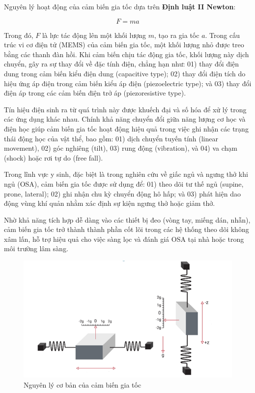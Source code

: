 Nguyên lý hoạt động của cảm biến gia tốc dựa trên 
\textbf{Định luật II Newton}:

\begin{equation}
F = ma
\end{equation}

Trong đó, $F$ là lực tác động lên một khối lượng $m$, tạo ra gia tốc $a$. Trong cấu trúc vi cơ điện tử (MEMS) của cảm biến gia tốc, một khối lượng nhỏ được treo bằng các thanh đàn hồi. Khi cảm biến chịu tác động gia tốc, khối lượng này dịch chuyển, gây ra sự thay đổi về đặc tính điện, chẳng hạn như: 01) thay đổi điện dung trong cảm biến kiểu điện dung (capacitive type); 02) thay đổi điện tích do hiệu ứng áp điện trong cảm biến kiểu áp điện (piezoelectric type); và 03) thay đổi điện áp trong các cảm biến điện trở áp (piezoresistive type).

Tín hiệu điện sinh ra từ quá trình này được khuếch đại và số hóa để xử lý trong các ứng dụng khác nhau. Chính khả năng chuyển đổi giữa năng lượng cơ học và điện học giúp cảm biến gia tốc hoạt động hiệu quả trong việc ghi nhận các trạng thái động học của vật thể, bao gồm: 01) dịch chuyển tuyến tính (linear movement), 02) góc nghiêng (tilt), 03) rung động (vibration), và 04) va chạm (shock) hoặc rơi tự do (free fall).

Trong lĩnh vực y sinh, đặc biệt là trong nghiên cứu về giấc ngủ và ngưng thở khi ngủ (OSA), cảm biến gia tốc được sử dụng để: 01) theo dõi tư thế ngủ (supine, prone, lateral); 02) ghi nhận chu kỳ chuyển động hô hấp; và 03) phát hiện dao động vùng khí quản nhằm xác định sự kiện ngưng thở hoặc giảm thở.

Nhờ khả năng tích hợp dễ dàng vào các thiết bị đeo (vòng tay, miếng dán, nhẫn), cảm biến gia tốc trở thành thành phần cốt lõi trong các hệ thống theo dõi không xâm lấn, hỗ trợ hiệu quả cho việc sàng lọc và đánh giá OSA tại nhà hoặc trong môi trường lâm sàng.
\begin{figure}[!ht]
		\centering
 		\includegraphics[width=\textwidth]{images/acce.png}
 		\vspace*{-7mm}
		\caption{Nguyên lý cơ bản của cảm biến gia tốc}
		\label{acce}
\end{figure}

